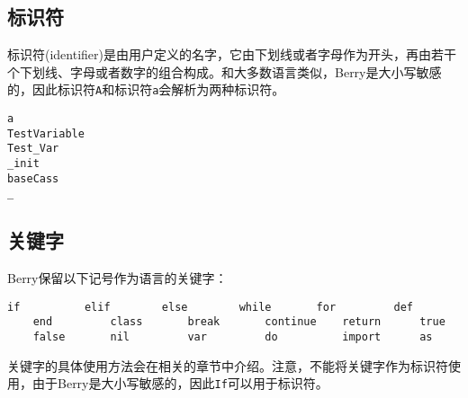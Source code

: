 \subsection{标识符} \label{section:identifier}

标识符(identifier)是由用户定义的名字，它由下划线或者字母作为开头，再由若干个下划线、字母或者数字的组合构成。和大多数语言类似，Berry是大小写敏感的，因此标识符\texttt{A}和标识符\texttt{a}会解析为两种标识符。
\begin{lstlisting}[language=berry, numbers=none]
a
TestVariable
Test_Var
_init
baseCass
_
\end{lstlisting}

\subsection{关键字}

Berry保留以下记号作为语言的关键字：
\begin{lstlisting}[language=berry, numbers=none]
    if          elif        else        while       for         def
    end         class       break       continue    return      true
    false       nil         var         do          import      as
\end{lstlisting}

关键字的具体使用方法会在相关的章节中介绍。注意，不能将关键字作为标识符使用，由于Berry是大小写敏感的，因此\texttt{If}可以用于标识符。
